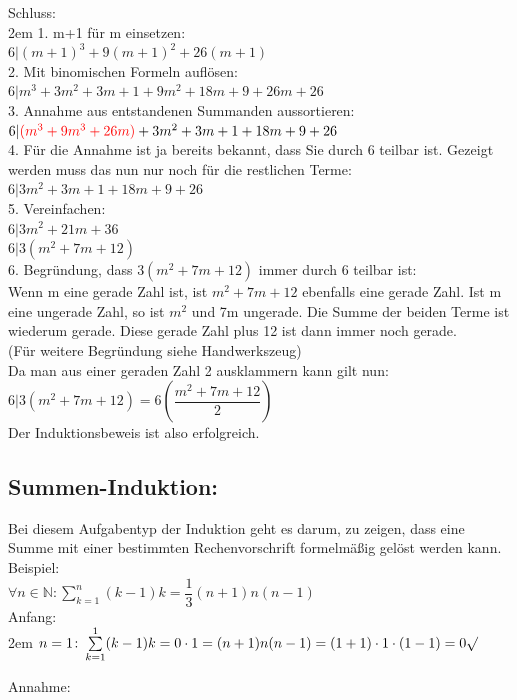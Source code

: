 \documentclass[11pt,final]{scrreprt}
\newcommand{\br} {\medskip\\}
\newcommand{\N} {\mathbb N}
\begin{document}
Schluss:\\

\begingroup
\leftskip2em 
1. m+1 für m einsetzen:\\
$ 6|(m+1)^3+9(m+1)^2+26(m+1) $\br
2. Mit binomischen Formeln auflösen:\\
$ 6| m^3+3m^2+3m+1+9m^2+18m+9+26m+26 $\br
3. Annahme aus entstandenen Summanden aussortieren:\\
$ 6| \textcolor{red}{(m^3+9m^3+26m)}+3m^2+3m+1+18m+9+26 $\br
4. Für die Annahme ist ja bereits bekannt, dass Sie durch 6 teilbar ist. Gezeigt werden muss das nun nur noch für die restlichen Terme:\\
$ 6|3m^2+3m+1+18m+9+26 $\br
5. Vereinfachen:\\
$ 6|3m^2+21m+36 $\\
$ 6|3(m^2+7m+12) $\br
6. Begründung, dass $ 3(m^2+7m+12) $ immer durch 6 teilbar ist:\\
Wenn m eine gerade Zahl ist, ist $m^2+7m+12$ ebenfalls eine gerade Zahl. Ist m eine ungerade Zahl, so ist $m^2$ und 7m ungerade. Die Summe der beiden Terme ist wiederum gerade. Diese gerade Zahl plus 12 ist dann immer noch gerade.\\
(Für weitere Begründung siehe Handwerkszeug)\\
Da man aus einer geraden Zahl 2 ausklammern kann gilt nun:\\
$6 | 3 (m^2+7m+12) = 6 \left( \dfrac{m^2+7m+12}{2} \right)$\\
Der Induktionsbeweis ist also erfolgreich.
\par	
\endgroup 

\subsection{Summen-Induktion:}

Bei diesem Aufgabentyp der Induktion geht es darum, zu zeigen, dass eine Summe mit einer bestimmten Rechenvorschrift formelmäßig gelöst werden kann.\br
Beispiel:\\
$ \forall n \in \N: \sum\limits_{k=1}^n (k-1)k = \dfrac{1}{3} (n+1)n(n-1) $ \br

Anfang:\\

\begingroup
\leftskip2em 
$ n=1 \colon \sum\limits_{k=1}^1 (k-1)k = 0 \cdot 1 = (n+1)n(n-1) = (1+1) \cdot 1 \cdot (1-1)= 0 \surd $\\
\par	
\endgroup 

Annahme:\\
\end{document}
